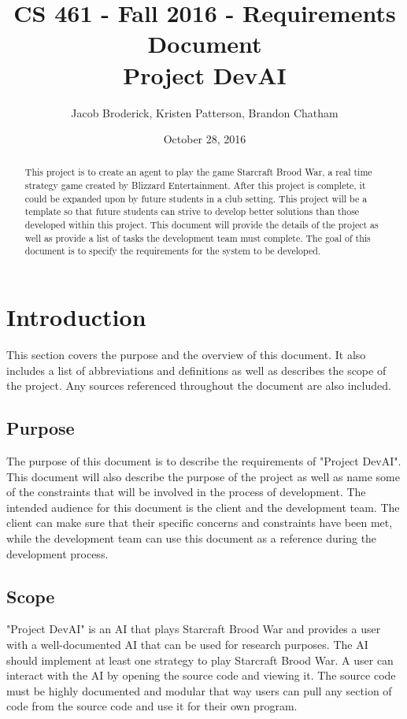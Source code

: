 \documentclass[10pt,letterpaper,onecolumn,draftclsnofoot]{IEEEtran}
\begin{document}
\begin{titlepage}

  \title{CS 461 - Fall 2016 - Requirements Document \\ Project DevAI}
  \author{Jacob Broderick, Kristen Patterson, Brandon Chatham}
  \date{October 28, 2016}
  \maketitle
  \vspace{4cm}
  \begin{abstract}
  	\noindent 
  	  	\noindent
	This project is to create an agent to play the game Starcraft Brood War, a real time strategy game created by Blizzard Entertainment. After this project is complete, it could be expanded upon by future students in a club setting. This project will be a template so that future students can strive to develop better solutions than those developed within this project. This document will provide the details of the project as well as provide a list of tasks the development team must complete. The goal of this document is to specify the requirements for the system to be developed.
   \end{abstract}
\end{titlepage}

\tableofcontents
\newpage

\section{Introduction}
This section covers the purpose and the overview of this document. It also includes a list of abbreviations and definitions as well as describes the scope of the project. Any sources referenced throughout the document are also included.

\subsection{Purpose}
The purpose of this document is to describe the requirements of "Project DevAI". This document will also describe the purpose of the project as well as name some of the constraints that will be involved in the process of development. The intended audience for this document is the client and the development team. The client can make sure that their specific concerns and constraints have been met, while the development team can use this document as a reference during the development process.

\subsection{Scope}
"Project DevAI" is an AI that plays Starcraft Brood War and provides a user with a well-documented AI that can be used for research purposes. The AI should implement at least one strategy to play Starcraft Brood War. A user can interact with the AI by opening the source code and viewing it. The source code must be highly documented and modular that way users can pull any section of code from the source code and use it for their own program.
\end{document}
